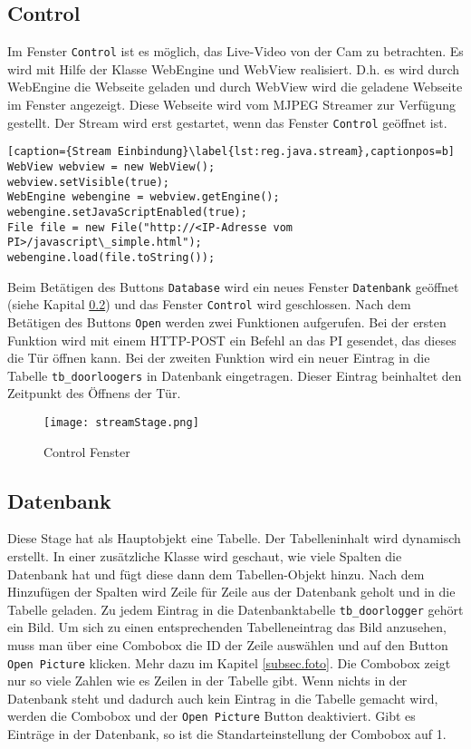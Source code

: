 \subsection{Control}
\label{subsec.control}

Im Fenster \texttt{Control} ist es möglich, das Live-Video von der Cam zu betrachten. Es wird mit Hilfe der Klasse WebEngine und WebView realisiert. D.h. es wird durch WebEngine die Webseite geladen und durch WebView wird die geladene Webseite im Fenster angezeigt. Diese Webseite wird vom MJPEG Streamer zur Verfügung gestellt. Der Stream wird erst gestartet, wenn das Fenster \texttt{Control} geöffnet ist.

\begin{lstlisting}[caption={Stream Einbindung}\label{lst:reg.java.stream},captionpos=b]
WebView webview = new WebView();
webview.setVisible(true);
WebEngine webengine = webview.getEngine();
webengine.setJavaScriptEnabled(true);
File file = new File("http://<IP-Adresse vom PI>/javascript\_simple.html");
webengine.load(file.toString());
\end{lstlisting}

Beim Betätigen des Buttons \texttt{Database} wird ein neues Fenster \texttt{Datenbank} geöffnet (siehe Kapital \ref{subsec.datenbank}) und das Fenster \texttt{Control} wird geschlossen. 
Nach dem Betätigen des Buttons \texttt{Open} werden zwei Funktionen aufgerufen. Bei der ersten Funktion wird mit einem HTTP-POST ein Befehl an das PI gesendet, das dieses die Tür öffnen kann. Bei der zweiten Funktion wird ein neuer Eintrag in die Tabelle \texttt{tb\_doorloogers} in Datenbank eingetragen. Dieser Eintrag beinhaltet den Zeitpunkt des Öffnens der Tür.


\begin{figure}[h]
  \begin{center}
    \texttt{[image: streamStage.png]}
  		  \caption{Control Fenster}
     \label{fig.StreamFenster}
  \end{center}
\end{figure}

\subsection{Datenbank}
\label{subsec.datenbank}
Diese Stage hat als Hauptobjekt eine Tabelle. Der Tabelleninhalt wird dynamisch erstellt. In einer zusätzliche Klasse wird geschaut, wie viele Spalten die Datenbank hat und fügt diese dann dem Tabellen-Objekt hinzu. Nach dem Hinzufügen der Spalten wird Zeile für Zeile aus der Datenbank geholt und in die Tabelle geladen. Zu jedem Eintrag in die Datenbanktabelle \texttt{tb\_doorlogger} gehört ein Bild. Um sich zu einen entsprechenden Tabelleneintrag das Bild anzusehen, muss man über eine Combobox die ID der Zeile auswählen und auf den Button \texttt{Open Picture} klicken. Mehr dazu im Kapitel \ref{subsec.foto}. Die Combobox zeigt nur so viele Zahlen wie es Zeilen in der Tabelle gibt. Wenn nichts in der Datenbank steht und dadurch auch kein Eintrag in die Tabelle gemacht wird, werden die Combobox und der \texttt{Open Picture} Button deaktiviert. Gibt es Einträge in der Datenbank, so ist die Standarteinstellung der Combobox auf 1.

